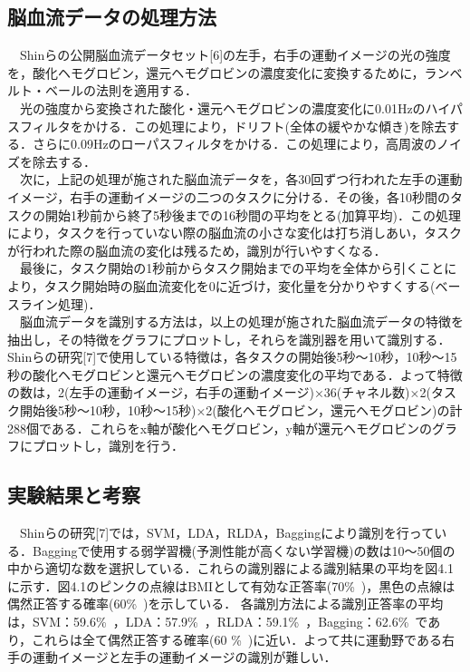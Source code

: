 \documentclass[a4j,12pt]{jreport}
\begin{document}
\subsection{脳血流データの処理方法}
　Shinらの公開脳血流データセット[6]の左手，右手の運動イメージの光の強度を，酸化ヘモグロビン，還元ヘモグロビンの濃度変化に変換するために，ランベルト・ベールの法則を適用する．\\
　光の強度から変換された酸化・還元ヘモグロビンの濃度変化に0.01Hzのハイパスフィルタをかける．この処理により，ドリフト(全体の緩やかな傾き)を除去する．さらに0.09Hzのローパスフィルタをかける．この処理により，高周波のノイズを除去する．\\
　次に，上記の処理が施された脳血流データを，各30回ずつ行われた左手の運動イメージ，右手の運動イメージの二つのタスクに分ける．その後，各10秒間のタスクの開始1秒前から終了5秒後までの16秒間の平均をとる(加算平均)．この処理により，タスクを行っていない際の脳血流の小さな変化は打ち消しあい，タスクが行われた際の脳血流の変化は残るため，識別が行いやすくなる．\\
　最後に，タスク開始の1秒前からタスク開始までの平均を全体から引くことにより，タスク開始時の脳血流変化を0に近づけ，変化量を分かりやすくする(ベースライン処理)．\\
　脳血流データを識別する方法は，以上の処理が施された脳血流データの特徴を抽出し，その特徴をグラフにプロットし，それらを識別器を用いて識別する．Shinらの研究[7]で使用している特徴は，各タスクの開始後5秒～10秒，10秒～15秒の酸化ヘモグロビンと還元ヘモグロビンの濃度変化の平均である．よって特徴の数は，2(左手の運動イメージ，右手の運動イメージ)×36(チャネル数)×2(タスク開始後5秒～10秒，10秒～15秒)×2(酸化ヘモグロビン，還元ヘモグロビン)の計288個である．これらをx軸が酸化ヘモグロビン，y軸が還元ヘモグロビンのグラフにプロットし，識別を行う．\\

\subsection{実験結果と考察}
　Shinらの研究[7]では，SVM，LDA，RLDA，Baggingにより識別を行っている．Baggingで使用する弱学習機(予測性能が高くない学習機)の数は10～50個の中から適切な数を選択している．これらの識別器による識別結果の平均を図4.1に示す．図4.1のピンクの点線はBMIとして有効な正答率(70\%\ )，黒色の点線は偶然正答する確率(60\%\ )を示している． 各識別方法による識別正答率の平均は，SVM：59.6\%\ ，LDA：57.9\%\ ，RLDA：59.1\%\ ，Bagging：62.6\%\ であり，これらは全て偶然正答する確率(60 \%\ )に近い．よって共に運動野である右手の運動イメージと左手の運動イメージの識別が難しい．\\
\end{document}
